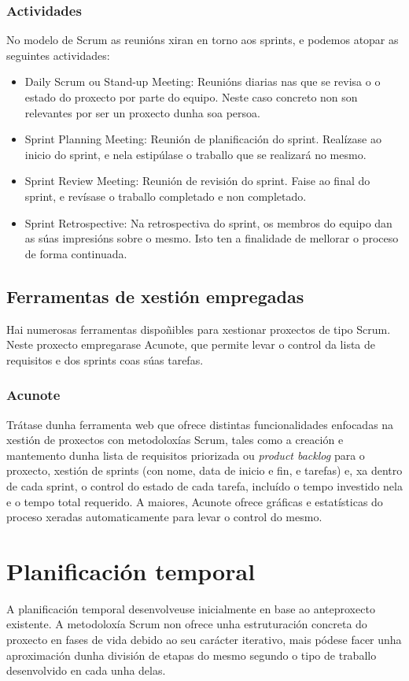 \subsubsection{Actividades}
No modelo de Scrum as reunións xiran en torno aos sprints, e podemos atopar as
seguintes actividades:
\begin{itemize}
  \item Daily Scrum ou Stand-up Meeting: Reunións diarias nas que se revisa o
  o estado do proxecto por parte do equipo. Neste caso concreto non son
  relevantes por ser un proxecto dunha soa persoa.
  \item Sprint Planning Meeting: Reunión de planificación do sprint. Realízase
  ao inicio do sprint, e nela estipúlase o traballo que se realizará no mesmo.
  \item Sprint Review Meeting: Reunión de revisión do sprint. Faise ao final do
  sprint, e revísase o traballo completado e non completado.
  \item Sprint Retrospective: Na retrospectiva do sprint, os membros do equipo
  dan as súas impresións sobre o mesmo. Isto ten a finalidade de mellorar o
  proceso de forma continuada.
\end{itemize}

\subsection{Ferramentas de xestión empregadas}
Hai numerosas ferramentas dispoñibles para xestionar proxectos de tipo Scrum.
Neste proxecto empregarase Acunote, que permite levar o control da lista de
requisitos e dos sprints coas súas tarefas.

\subsubsection{Acunote}
Trátase dunha ferramenta web que ofrece distintas funcionalidades enfocadas na
xestión de proxectos con metodoloxías Scrum, tales como a creación e mantemento
dunha lista de requisitos priorizada ou \textit{product backlog} para o
proxecto, xestión de sprints (con nome, data de inicio e fin, e tarefas) e, xa
dentro de cada sprint, o control do estado de cada tarefa, incluído o tempo
investido nela e o tempo total requerido. A maiores, Acunote ofrece gráficas e
estatísticas do proceso xeradas automaticamente para levar o control do mesmo.

\section{Planificación temporal}
A planificación temporal desenvolveuse inicialmente en base ao anteproxecto
existente. A metodoloxía Scrum non ofrece unha estruturación concreta do
proxecto en fases de vida debido ao seu carácter iterativo, mais pódese facer
unha aproximación dunha división de etapas do mesmo segundo o tipo de traballo
desenvolvido en cada unha delas.

